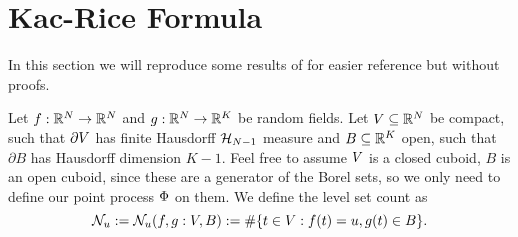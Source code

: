 \section{Kac-Rice Formula}

In this section we will reproduce some results of
\textcite{adlerRandomFieldsGeometry2007} for easier reference but without
proofs.

Let \(f:\mathbb{R}^N\to\mathbb{R}^N\) and \(g:\mathbb{R}^N\to\mathbb{R}^K\)
be random fields. Let \(V\subseteq \mathbb{R}^N\) be compact,
such that \(\partial V\) has finite Hausdorff \(\mathcal{H}_{N-1}\)
measure and \(B\subseteq \mathbb{R}^K\) open, such that \(\partial B\) has Hausdorff
dimension \(K-1\).
Feel free to assume \(V\) is a closed cuboid, \(B\) is an open cuboid, since
these are a generator of the Borel sets, so we only need to define our point
process \(\Phi\) on them.
We define the level set count as
\[
	\mathcal{N}_{u}:= \mathcal{N}_{u}(f, g: V, B) := \#\{t\in V : f(t) = u, g(t)\in B\}.
\]
